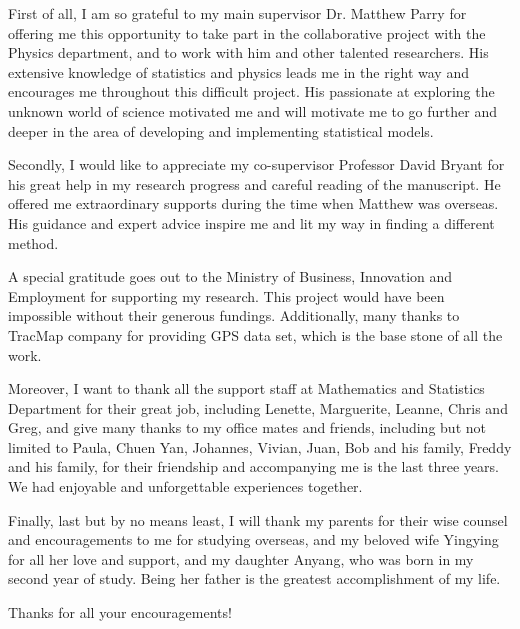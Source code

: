 First of all, I am so grateful to my main supervisor Dr. Matthew Parry for offering me this opportunity to take part in the collaborative project with the Physics department, and to work with him and other talented researchers. His extensive knowledge of statistics and physics leads me in the right way and encourages me throughout this difficult project. His passionate at exploring the unknown world of science motivated me and will motivate me to go further and deeper in the area of developing and implementing statistical models.  

Secondly, I would like to appreciate my co-supervisor Professor David Bryant for his great help in my research progress and careful reading of the manuscript. He offered me extraordinary supports during the time when Matthew was overseas. His guidance and expert advice inspire me and lit my way in finding a different method. 

A special gratitude goes out to the Ministry of Business, Innovation and Employment for supporting my research. This project would have been impossible without their generous fundings. Additionally, many thanks to TracMap company for providing GPS data set, which is the base stone of all the work. 

Moreover, I want to thank all the support staff at Mathematics and Statistics Department for their great job, including Lenette, Marguerite, Leanne, Chris and Greg, and give many thanks to my office mates and friends, including but not limited to Paula, Chuen Yan, Johannes, Vivian, Juan, Bob and his family, Freddy and his family, for their friendship and accompanying me is the last three years. We had enjoyable and unforgettable experiences together. 

Finally, last but by no means least, I will thank my parents for their wise counsel and encouragements to me for studying overseas, and my beloved wife Yingying for all her love and support, and my daughter Anyang, who was born in my second year of study. Being her father is the greatest accomplishment of my life.

Thanks for all your encouragements! 

